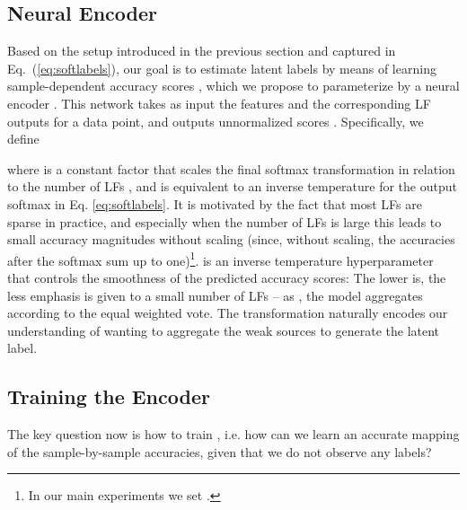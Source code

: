 \documentclass{article}
\newcommand{\encoder}{}
\begin{document}
\subsection{Neural Encoder}
Based on the setup introduced in the previous section and captured in Eq.~(\ref{eq:softlabels}), our goal is to estimate latent labels by means of learning sample-dependent accuracy scores , which we propose to parameterize by a neural encoder \encoder. This network takes as input the features  and the corresponding LF outputs  for a data point, and outputs unnormalized scores .
Specifically, we define

where  is a constant factor that scales the final softmax transformation in relation to the number of LFs , and is equivalent to an inverse temperature for the output softmax in Eq. \ref{eq:softlabels}. It is motivated by the fact that most LFs are sparse in practice, and especially when the number of LFs is large this leads to small accuracy magnitudes without scaling (since, without scaling, the accuracies after the softmax sum up to one)\footnote{In our main experiments we set .}.  is an inverse temperature hyperparameter that controls the smoothness of the predicted accuracy scores: The lower  is, the less emphasis is given to a small number of LFs --  as , the model aggregates according to the equal weighted vote. 
The  transformation naturally encodes our understanding of wanting to aggregate the weak sources to generate the latent label. 

\subsection{Training the Encoder}
The key question now is how to train \encoder, i.e. how can we learn an accurate mapping of the sample-by-sample accuracies, given that we do not observe any labels? 
\end{document}
